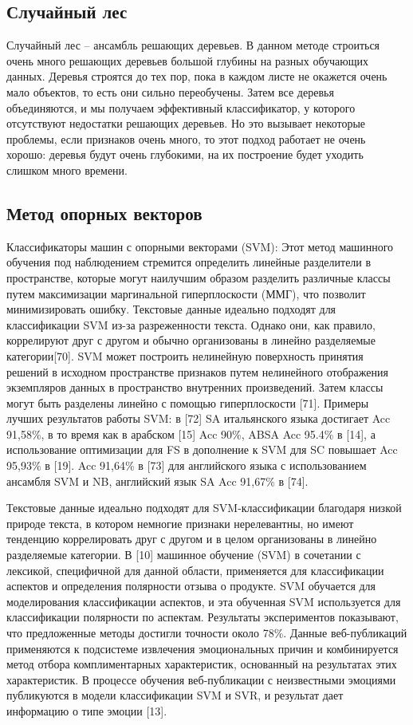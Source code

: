 \subsection{Случайный лес}

Случайный лес – ансамбль решающих деревьев. В данном методе строиться очень
много решающих деревьев большой глубины на разных обучающих данных. Деревья
строятся до тех пор, пока в каждом листе не окажется очень мало объектов, то
есть они сильно переобучены.  Затем все деревья объединяются, и мы получаем
эффективный классификатор, у которого отсутствуют недостатки решающих деревьев.
Но это вызывает некоторые проблемы, если признаков очень много, то этот подход
работает не очень хорошо: деревья будут очень глубокими, на их построение будет
уходить слишком много времени.~\cite{article9}

\subsection{Метод опорных векторов}

Классификаторы машин с опорными векторами (SVM): Этот метод машинного обучения
под наблюдением стремится определить линейные разделители в пространстве,
которые могут наилучшим образом разделить различные классы путем максимизации
маргинальной гиперплоскости (ММГ), что позволит минимизировать ошибку. Текстовые
данные идеально подходят для классификации SVM из-за разреженности текста.
Однако они, как правило, коррелируют друг с другом и обычно организованы в
линейно разделяемые категории[70]. SVM может построить нелинейную поверхность
принятия решений в исходном пространстве признаков путем нелинейного отображения
экземпляров данных в пространство внутренних произведений. Затем классы могут
быть разделены линейно с помощью гиперплоскости [71].  Примеры лучших
результатов работы SVM: в [72] SA итальянского языка достигает Acc 91,58\%, в то
время как в арабском [15] Acc 90\%, ABSA Acc 95.4\% в [14], а использование
оптимизации для FS в дополнение к SVM для SC повышает Acc 95,93\% в [19]. Acc
91,64\% в [73] для английского языка с использованием ансамбля SVM и NB,
английский язык SA Acc 91,67\% в [74].~\cite{article2}

Текстовые данные идеально подходят для SVM-классификации благодаря низкой
природе текста, в котором немногие признаки нерелевантны, но имеют тенденцию
коррелировать друг с другом и в целом организованы в линейно разделяемые
категории.
В [10] машинное обучение (SVM) в сочетании с лексикой, специфичной для данной
области, применяется для классификации аспектов и определения полярности отзыва
о продукте. SVM обучается для моделирования классификации аспектов, и эта
обученная SVM используется для классификации полярности по аспектам. Результаты
экспериментов показывают, что предложенные методы достигли точности около 78\%.
Данные веб-публикаций применяются к подсистеме извлечения эмоциональных причин и
комбинируется метод отбора комплиментарных характеристик, основанный на
результатах этих характеристик. В процессе обучения веб-публикации с
неизвестными эмоциями публикуются в модели классификации SVM и SVR, и результат
дает информацию о типе эмоции [13].~\cite{article4}


